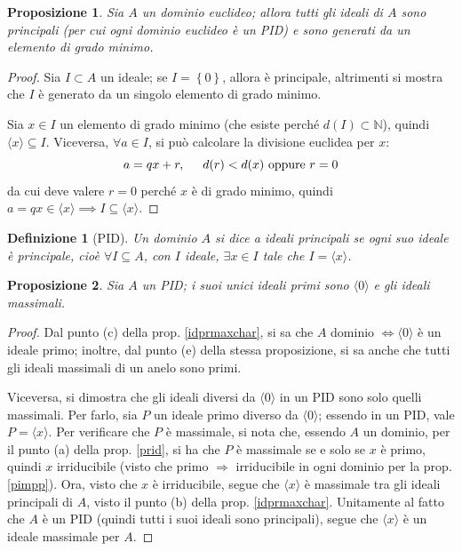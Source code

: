 \documentclass[11pt]{article}
\theoremstyle{style}
\newtheorem{definizione}{Definizione}[section]
\newtheorem{prop}{Proposizione}[section]
\numberwithin{equation}{subsection}
\begin{document}
\begin{prop}
	Sia $A$ un dominio euclideo; allora tutti gli ideali di $A$ sono principali (per cui ogni dominio euclideo \`e un PID) e sono generati da un elemento di grado minimo.
\end{prop}
	\begin{proof}
		Sia $I \subset A$ un ideale; se $I=\left\{ 0 \right\} $, allora \`e principale, altrimenti si mostra che $I$ \`e generato da un singolo elemento di grado minimo.

		Sia $x \in I$ un elemento di grado minimo (che esiste perch\'e $d(I) \subset \mathbb{N}$), quindi $\langle x \rangle\subseteq I$.
		Viceversa, $\forall a \in I$, si pu\`o calcolare la divisione euclidea per $x$:
		\[
		a = qx + r , \hspace{.5cm} d(r) < d(x) \text{ oppure } r=0
		\] 
		da cui deve valere $r=0$ perch\'e $x$ \`e di grado minimo, quindi $a=qx \in \langle x \rangle \implies I \subseteq \langle x \rangle$.
	\end{proof}
\begin{definizione}
	[PID]
	Un dominio $A$ si dice \textit{a ideali principali} se ogni suo ideale \`e principale, cio\`e $\forall I \subseteq A$, con $I$ ideale, $\exists x \in I $ tale che $I = \langle x \rangle$.
\end{definizione}
\begin{prop}\label{pideals}
	Sia $A$ un PID; i suoi unici ideali primi sono $\langle 0 \rangle$ e gli ideali massimali.
\end{prop}
	\begin{proof}
		Dal punto (c) della prop. \ref{idprmaxchar}, si sa che $A$ dominio $\iff \langle 0 \rangle$ \`e un ideale primo; inoltre, dal punto (e) della stessa proposizione, si sa anche che tutti gli ideali massimali di un anelo sono primi.

		Viceversa, si dimostra che gli ideali diversi da $\langle 0 \rangle $ in un PID sono solo quelli massimali.
		Per farlo, sia $P$ un ideale primo diverso da $\langle 0 \rangle$; essendo  in un PID, vale $P=\langle x \rangle$.
		Per verificare che $P$ \`e massimale, si nota che, essendo $A$ un dominio, per il punto (a) della prop. \ref{prid}, si ha che $P$ \`e massimale se e solo se $x$ \`e primo, quindi $x$ irriducibile (visto che primo $\Rightarrow $ irriducibile in ogni dominio per la prop. \ref{pimpp}).
		Ora, visto che $x$ \`e irriducibile, segue che $\langle x \rangle$ \`e massimale tra gli ideali principali di $A$, visto il punto (b) della prop. \ref{idprmaxchar}.
		Unitamente al fatto che $A$ \`e un PID (quindi tutti i suoi ideali sono principali), segue che $\langle x \rangle$ \`e un ideale massimale per $A$.
	\end{proof}
\end{document}
